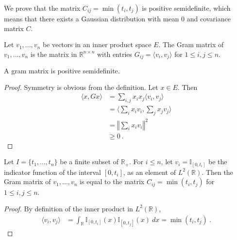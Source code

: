 



We prove that the matrix $C_{ij} = \min(t_i, t_j)$ is positive semidefinite, which means that there exists a Gaussian distribution with mean 0 and covariance matrix $C$.

\begin{definition}\label{def:gramMatrix}
  \leanok
Let $v_1, \ldots, v_n$ be vectors in an inner product space $E$.
The Gram matrix of $v_1, \ldots, v_n$ is the matrix in $\mathbb{R}^{n \times n}$ with entries $G_{ij} = \langle v_i, v_j \rangle$ for $1 \leq i,j \leq n$.
\end{definition}


\begin{lemma}\label{lem:posSemidef_gramMatrix}
  \leanok
A gram matrix is positive semidefinite.
\end{lemma}

\begin{proof}\leanok
Symmetry is obvious from the definition.
Let $x \in E$. Then
\begin{align*}
  \langle x, G x \rangle
  &= \sum_{i,j} x_i x_j \langle v_i, v_j \rangle
  \\
  &= \langle \sum_i x_i v_i, \sum_j x_j v_j \rangle
  \\
  &= \left\Vert \sum_i x_i v_i \right\Vert^2
  \\
  &\ge 0
  \: .
\end{align*}
\end{proof}


\begin{lemma}\label{lem:C_eq_gramMatrix}
  \leanok
Let $I = \{t_1, \ldots, t_n\}$ be a finite subset of $\mathbb{R}_+$.
For $i \le n$, let $v_i = \mathbb{I}_{[0, t_i]}$ be the indicator function of the interval $[0, t_i]$, as an element of $L^2(\mathbb{R})$.
Then the Gram matrix of $v_1, \ldots, v_n$ is equal to the matrix $C_{ij} = \min(t_i, t_j)$ for $1 \leq i,j \leq n$.
\end{lemma}

\begin{proof}\leanok
By definition of the inner product in $L^2(\mathbb{R})$,
\begin{align*}
  \langle v_i, v_j \rangle
  &= \int_{\mathbb{R}} \mathbb{I}_{[0, t_i]}(x) \mathbb{I}_{[0, t_j]}(x) \: dx
  = \min(t_i, t_j)
  \: .
\end{align*}
\end{proof}



